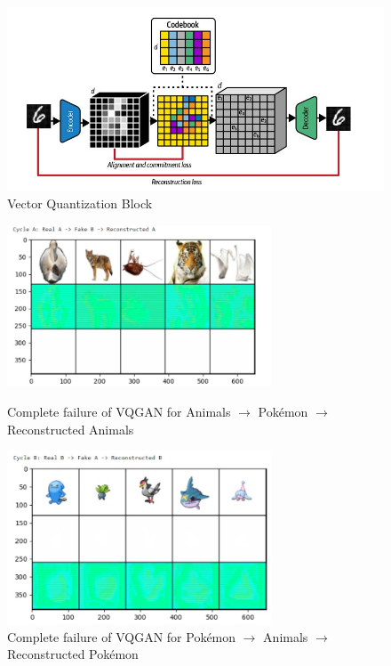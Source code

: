 \documentclass[twoside,english,notitlepage]{report}
\begin{document}
\begin{figure}[h]
    \centering
    \includegraphics[width=\textwidth]{task2/vq-block.jpg}
    \caption{Vector Quantization Block}
    \label{fig:vq-concept}
\end{figure}


\begin{figure}[h]
    \centering
    \includegraphics[width=0.7\textwidth]{task2/failedvq1.jpg}
    \vspace{-10pt}
    \caption{Complete failure of VQGAN for Animals $\rightarrow$ Pokémon $\rightarrow$ Reconstructed Animals}
    \vspace{12pt}
    \includegraphics[width=0.7\textwidth]{task2/failedvq2.jpg}
    \vspace{-10pt}
    \caption{Complete failure of VQGAN for Pokémon $\rightarrow$ Animals $\rightarrow$ Reconstructed Pokémon}
    \vspace{12pt}
    \label{fig:failed-vq}
\end{figure}



\end{document}
